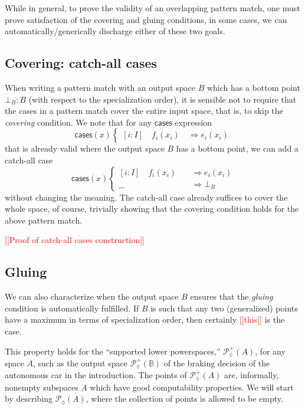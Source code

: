 \documentclass[conference]{IEEEtran}
\newcommand{\PLower}{\mathcal{P}_\lozenge}
\newcommand{\bool}{\mathbb{B}}
\newcommand{\Branch}{\Rightarrow}
\newcommand{\note}[1]{\textcolor{red}{[[{#1}]]}}
\begin{document}
While in general, to prove the validity of an overlapping pattern match, one must prove satisfaction of the covering and gluing conditions, in some cases, we can automatically/generically discharge either of these two goals. 

\subsection{Covering: catch-all cases}

When writing a pattern match with an output space $B$ which has a bottom point $\bot_B : B$ (with respect to the specialization order), it is sensible not to require that the cases in a pattern match cover the entire input space, that is, to skip the \emph{covering} condition. We note that for any $\mathsf{cases}$ expression
\[
\mathsf{cases}(x)
\begin{cases}
[i : I] \quad f_i(x_i) \quad \Branch e_i(x_i)
\end{cases}
\]
that is already valid where the output space $B$ has a bottom point, we can add a catch-all case
\[
\mathsf{cases}(x)
\begin{cases}
[i : I] \quad f_i(x_i) \quad &\Branch e_i(x_i)
\\ \_\_ \quad &\Branch \bot_B
\end{cases}
\]
without changing the meaning. The catch-all case already suffices to cover the whole space, of course, trivially showing that the covering condition holds for the above pattern match.

\note{Proof of catch-all cases construction}

\subsection{Gluing}

We can also characterize when the output space $B$ ensures that the \emph{gluing} condition is automatically fulfilled. If $B$ is such that any two (generalized) points have a maximum in terms of specialization order, then certainly \note{this} is the case.

This property holds for the ``supported lower powerspaces,'' $\PLower^+(A)$, for any space $A$, such as the output space $\PLower^+(\bool)$ of the braking decision of the autonomous car in the introduction. The points of $\PLower^+(A)$ are, informally, nonempty subspaces $A$ which have good computability properties. We will start by describing $\PLower(A)$, where the collection of points is allowed to be empty.
\end{document}
